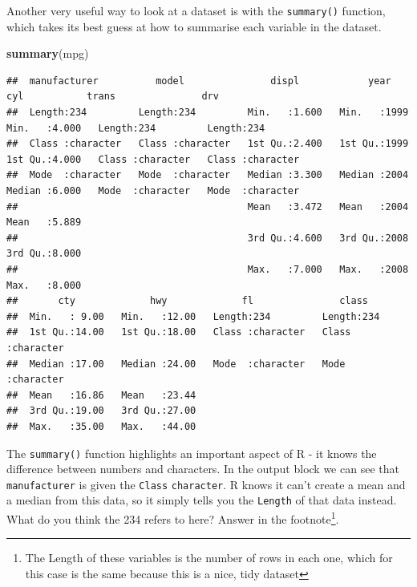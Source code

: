 \documentclass[
]{book}
\newenvironment{Shaded}{\begin{snugshade}}{\end{snugshade}}
\newcommand{\KeywordTok}[1]{\textcolor[rgb]{0.13,0.29,0.53}{\textbf{#1}}}
\newcommand{\NormalTok}[1]{#1}
\begin{document}
Another very useful way to look at a dataset is with the \texttt{summary()} function, which takes its best guess at how to summarise each variable in the dataset.

\begin{Shaded}
\begin{Highlighting}[]
\KeywordTok{summary}\NormalTok{(mpg)}
\end{Highlighting}
\end{Shaded}

\begin{verbatim}
##  manufacturer          model               displ            year           cyl           trans               drv           
##  Length:234         Length:234         Min.   :1.600   Min.   :1999   Min.   :4.000   Length:234         Length:234        
##  Class :character   Class :character   1st Qu.:2.400   1st Qu.:1999   1st Qu.:4.000   Class :character   Class :character  
##  Mode  :character   Mode  :character   Median :3.300   Median :2004   Median :6.000   Mode  :character   Mode  :character  
##                                        Mean   :3.472   Mean   :2004   Mean   :5.889                                        
##                                        3rd Qu.:4.600   3rd Qu.:2008   3rd Qu.:8.000                                        
##                                        Max.   :7.000   Max.   :2008   Max.   :8.000                                        
##       cty             hwy             fl               class          
##  Min.   : 9.00   Min.   :12.00   Length:234         Length:234        
##  1st Qu.:14.00   1st Qu.:18.00   Class :character   Class :character  
##  Median :17.00   Median :24.00   Mode  :character   Mode  :character  
##  Mean   :16.86   Mean   :23.44                                        
##  3rd Qu.:19.00   3rd Qu.:27.00                                        
##  Max.   :35.00   Max.   :44.00
\end{verbatim}

The \texttt{summary()} function highlights an important aspect of R - it knows the difference between numbers and characters. In the output block we can see that \texttt{manufacturer} is given the \texttt{Class} \texttt{character}. R knows it can't create a mean and a median from this data, so it simply tells you the \texttt{Length} of that data instead. What do you think the 234 refers to here? Answer in the footnote\footnote{The Length of these variables is the number of rows in each one, which for this case is the same because this is a nice, tidy dataset}.
\end{document}
